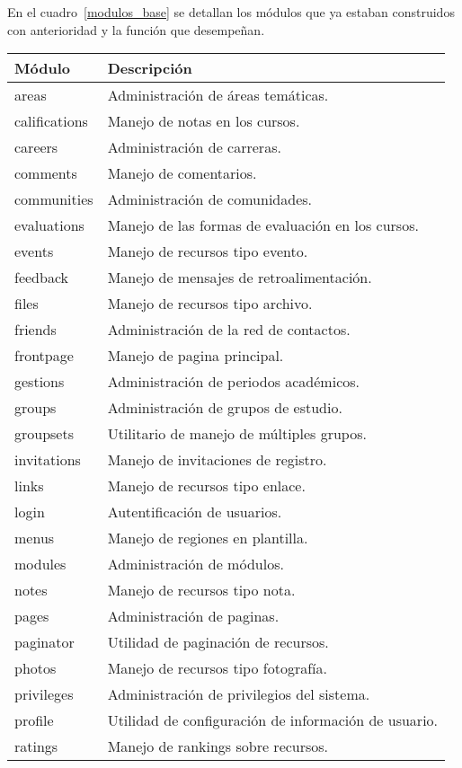 \begin{description}
En el cuadro~\ref{modulos_base} se detallan los módulos que ya estaban construidos con anterioridad y la función que
desempeñan.

\begin{table}
\begin{tabular}{l|l}
Módulo & Descripción \\
\hline
areas & Administración de áreas temáticas. \\
califications & Manejo de notas en los cursos. \\
careers & Administración de carreras. \\
comments & Manejo de comentarios. \\
communities & Administración de comunidades. \\
evaluations & Manejo de las formas de evaluación en los cursos. \\
events & Manejo de recursos tipo evento. \\
feedback & Manejo de mensajes de retroalimentación. \\
files & Manejo de recursos tipo archivo. \\
friends & Administración de la red de contactos. \\
frontpage & Manejo de pagina principal. \\
gestions & Administración de periodos académicos. \\
groups & Administración de grupos de estudio. \\
groupsets & Utilitario de manejo de múltiples grupos. \\
invitations & Manejo de invitaciones de registro. \\
links & Manejo de recursos tipo enlace. \\
login & Autentificación de usuarios. \\
menus & Manejo de regiones en plantilla. \\
modules & Administración de módulos. \\
notes & Manejo de recursos tipo nota. \\
pages & Administración de paginas. \\
paginator & Utilidad de paginación de recursos. \\
photos & Manejo de recursos tipo fotografía. \\
privileges & Administración de privilegios del sistema. \\
profile & Utilidad de configuración de información de usuario. \\
ratings & Manejo de rankings sobre recursos. \\

\end{tabular}
\end{table}
\end{description}
